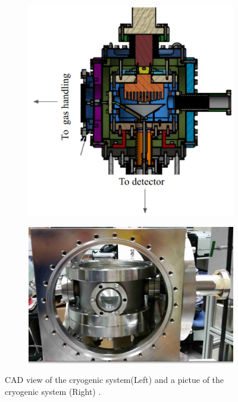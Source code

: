 \begin{figure}
   \centering
    \begin{subfigure}[c]{0.25\textheight}
    \includegraphics[width=\textwidth]{cryoMirror.png}
    \end{subfigure}
    \begin{subfigure}[c]{0.25\textheight}
    \includegraphics[width=\textwidth]{cryoOpenCrop.png}
    \end{subfigure}
        \caption{ CAD view of the cryogenic system(Left) and a pictue of the cryogenic system (Right) . \label{fig:cryo}}
\end{figure}



